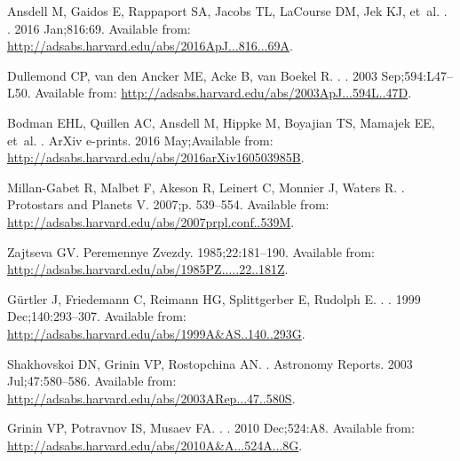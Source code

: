 \documentclass[]{rsos}
\begin{document}
\begin{thebibliography}{10}
{Ansdell} M, {Gaidos} E, {Rappaport} SA, {Jacobs} TL, {LaCourse} DM, {Jek} KJ,
  et~al.
.
\newblock \apj. 2016 Jan;816:69.
\newblock Available from:
  \url{http://adsabs.harvard.edu/abs/2016ApJ...816...69A}.

{Dullemond} CP, {van den Ancker} ME, {Acke} B, {van Boekel} R.
.
\newblock \apjl. 2003 Sep;594:L47--L50.
\newblock Available from:
  \url{http://adsabs.harvard.edu/abs/2003ApJ...594L..47D}.

{Bodman} EHL, {Quillen} AC, {Ansdell} M, {Hippke} M, {Boyajian} TS, {Mamajek}
  EE, et~al.
.
\newblock ArXiv e-prints. 2016 May;Available from:
  \url{http://adsabs.harvard.edu/abs/2016arXiv160503985B}.

{Millan-Gabet} R, {Malbet} F, {Akeson} R, {Leinert} C, {Monnier} J, {Waters} R.
.
\newblock Protostars and Planets V. 2007;p. 539--554.
\newblock Available from:
  \url{http://adsabs.harvard.edu/abs/2007prpl.conf..539M}.

{Zajtseva} GV.
\newblock Peremennye Zvezdy. 1985;22:181--190.
\newblock Available from:
  \url{http://adsabs.harvard.edu/abs/1985PZ.....22..181Z}.

{G{\"u}rtler} J, {Friedemann} C, {Reimann} HG, {Splittgerber} E, {Rudolph} E.
.
\newblock \aaps. 1999 Dec;140:293--307.
\newblock Available from:
  \url{http://adsabs.harvard.edu/abs/1999A&AS..140..293G}.

{Shakhovskoi} DN, {Grinin} VP, {Rostopchina} AN.
.
\newblock Astronomy Reports. 2003 Jul;47:580--586.
\newblock Available from:
  \url{http://adsabs.harvard.edu/abs/2003ARep...47..580S}.

{Grinin} VP, {Potravnov} IS, {Musaev} FA.
.
\newblock \aap. 2010 Dec;524:A8.
\newblock Available from:
  \url{http://adsabs.harvard.edu/abs/2010A&A...524A...8G}.


\end{thebibliography}
\end{document}
